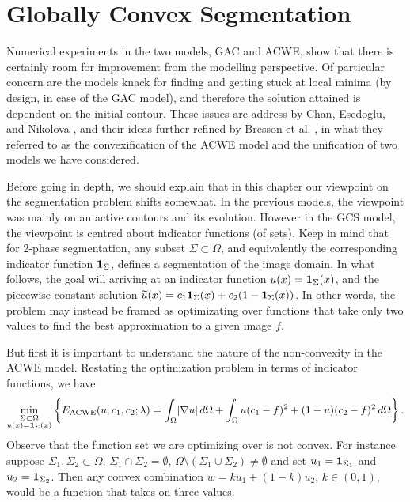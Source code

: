 \chapter{Globally Convex Segmentation}
Numerical experiments in the two models, GAC and ACWE, show that there is certainly room for improvement from the modelling perspective. Of particular concern are the models knack for finding and getting stuck at local minima (by design, in case of the GAC model), and therefore the solution attained is dependent on the initial contour. These issues are address by Chan, Esedo\={g}lu, and Nikolova \cite{chan2006algorithms}, and their ideas further refined by Bresson et al. \cite{bresson2007fast}, in what they referred to as the convexification of the ACWE model and the unification of two models we have considered.

Before going in depth, we should explain that in this chapter our viewpoint on the segmentation problem shifts somewhat. In the previous models, the viewpoint was mainly on an active contours and its evolution. However in the GCS model, the viewpoint is centred about indicator functions (of sets). Keep in mind that for 2-phase segmentation, any subset $\Sigma \subset \Omega$, and equivalently the corresponding indicator function $\mathbf{1}_\Sigma$, defines a segmentation of the image domain. In what follows, the goal will arriving at an indicator function $u(x) = \mathbf{1}_\Sigma(x)$, and the piecewise constant solution $\widetilde u(x) = c_1 \mathbf{1}_\Sigma(x) + c_2 (1 - \mathbf{1}_\Sigma(x))$. In other words, the problem may instead be framed as optimizating over functions that take only two values to find the best approximation to a given image $f$.

But first it is important to understand the nature of the non-convexity in the ACWE model. Restating the optimization problem in terms of indicator functions, we have 
\begin{align}
\min_{\substack{\Sigma\subset\Omega \\ 
		u(x) = \mathbf{1}_\Sigma(x)}} 
\left\{E_\textrm{ACWE}(u, c_1, c_2; \lambda)
= \int_{\Omega} \lvert\nabla u\rvert \,d\Omega 
+ \int_\Omega u(c_1 - f)^2   + (1-u)(c_2 - f)^2 \,d\Omega 
\right\}.
\label{eq:eacwe2}
\end{align}
Observe that the function set we are optimizing over is not convex. For instance suppose $\Sigma_1, \Sigma_2 \subset \Omega$, $\Sigma_1 \cap \Sigma_2 = \emptyset$, $\Omega \setminus (\Sigma_1 \cup \Sigma_2) \neq \emptyset$ and set $u_1 = \mathbf{1}_{\Sigma_1}$ and $u_2 = \mathbf{1}_{\Sigma_2}$. Then any convex combination $w = ku_1 + (1-k)u_2$, $k \in (0,1)$, would be a function that takes on three values. 

